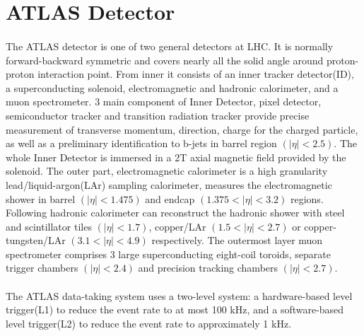 \section{ATLAS Detector}
\label{sec:atlasdet}
\paragraph{} The ATLAS detector is one of two general detectors at LHC. It is normally forward-backward symmetric and covers nearly all the solid angle around proton-proton interaction point. From inner it consists of an inner tracker detector(ID), a superconducting solenoid, electromagnetic and hadronic calorimeter, and a muon spectrometer. 3 main component of Inner Detector, pixel detector, semiconductor tracker and transition radiation tracker provide precise measurement of transverse momentum, direction, charge for the charged particle, as well as a preliminary identification to b-jets in barrel region $(|\eta|<2.5)$. The whole Inner Detector is immersed in a 2T axial magnetic field provided by the solenoid. The outer part, electromagnetic calorimeter is a high granularity lead/liquid-argon(LAr) sampling calorimeter, measures the electromagnetic shower in barrel $(|\eta|<1.475)$ and endcap $(1.375<|\eta|<3.2)$ regions. Following hadronic calorimeter can reconstruct the hadronic shower with steel and scintillator tiles $(|\eta|<1.7)$, copper/LAr $(1.5<|\eta|<2.7)$ or copper-tungsten/LAr $(3.1<|\eta|<4.9)$ respectively. The outermost layer muon spectrometer comprises 3 large superconducting eight-coil toroids, separate trigger chambers $(|\eta|<2.4)$ and precision tracking chambers $(|\eta|<2.7)$.

\paragraph{} The ATLAS data-taking system uses a two-level system: a hardware-based level trigger(L1) to reduce the event rate to at most 100 kHz, and a software-based level trigger(L2) to reduce the event rate to approximately 1 kHz. 

